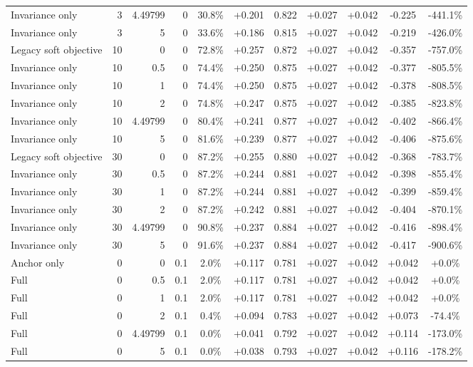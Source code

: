 \begin{table}[htbp]
\begin{tabular}{lrrrccccccc}
Invariance only & 3 & 4.49799 & 0 & 30.8\% & +0.201 & 0.822 & +0.027 & +0.042 & -0.225 & -441.1\% \\
Invariance only & 3 & 5 & 0 & 33.6\% & +0.186 & 0.815 & +0.027 & +0.042 & -0.219 & -426.0\% \\
Legacy soft objective & 10 & 0 & 0 & 72.8\% & +0.257 & 0.872 & +0.027 & +0.042 & -0.357 & -757.0\% \\
Invariance only & 10 & 0.5 & 0 & 74.4\% & +0.250 & 0.875 & +0.027 & +0.042 & -0.377 & -805.5\% \\
Invariance only & 10 & 1 & 0 & 74.4\% & +0.250 & 0.875 & +0.027 & +0.042 & -0.378 & -808.5\% \\
Invariance only & 10 & 2 & 0 & 74.8\% & +0.247 & 0.875 & +0.027 & +0.042 & -0.385 & -823.8\% \\
Invariance only & 10 & 4.49799 & 0 & 80.4\% & +0.241 & 0.877 & +0.027 & +0.042 & -0.402 & -866.4\% \\
Invariance only & 10 & 5 & 0 & 81.6\% & +0.239 & 0.877 & +0.027 & +0.042 & -0.406 & -875.6\% \\
Legacy soft objective & 30 & 0 & 0 & 87.2\% & +0.255 & 0.880 & +0.027 & +0.042 & -0.368 & -783.7\% \\
Invariance only & 30 & 0.5 & 0 & 87.2\% & +0.244 & 0.881 & +0.027 & +0.042 & -0.398 & -855.4\% \\
Invariance only & 30 & 1 & 0 & 87.2\% & +0.244 & 0.881 & +0.027 & +0.042 & -0.399 & -859.4\% \\
Invariance only & 30 & 2 & 0 & 87.2\% & +0.242 & 0.881 & +0.027 & +0.042 & -0.404 & -870.1\% \\
Invariance only & 30 & 4.49799 & 0 & 90.8\% & +0.237 & 0.884 & +0.027 & +0.042 & -0.416 & -898.4\% \\
Invariance only & 30 & 5 & 0 & 91.6\% & +0.237 & 0.884 & +0.027 & +0.042 & -0.417 & -900.6\% \\
Anchor only & 0 & 0 & 0.1 & 2.0\% & +0.117 & 0.781 & +0.027 & +0.042 & +0.042 & +0.0\% \\
Full & 0 & 0.5 & 0.1 & 2.0\% & +0.117 & 0.781 & +0.027 & +0.042 & +0.042 & +0.0\% \\
Full & 0 & 1 & 0.1 & 2.0\% & +0.117 & 0.781 & +0.027 & +0.042 & +0.042 & +0.0\% \\
Full & 0 & 2 & 0.1 & 0.4\% & +0.094 & 0.783 & +0.027 & +0.042 & +0.073 & -74.4\% \\
Full & 0 & 4.49799 & 0.1 & 0.0\% & +0.041 & 0.792 & +0.027 & +0.042 & +0.114 & -173.0\% \\
Full & 0 & 5 & 0.1 & 0.0\% & +0.038 & 0.793 & +0.027 & +0.042 & +0.116 & -178.2\% \\

\end{tabular}
\end{table}
